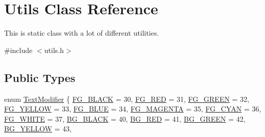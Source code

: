 \hypertarget{classUtils}{}\section{Utils Class Reference}
\label{classUtils}


This is static class with a lot of different utilities.  




{\ttfamily \#include $<$utils.\+h$>$}

\subsection*{Public Types}
\begin{DoxyCompactItemize}
\item 
enum \mbox{\hyperlink{classUtils_a32d52b4a749614335d60c2c3969b8df2}{Text\+Modifier}} \{ \newline
\mbox{\hyperlink{classUtils_a32d52b4a749614335d60c2c3969b8df2a39f1a78939e1d4ce79bcc88d8f0d6a1f}{F\+G\+\_\+\+B\+L\+A\+CK}} = 30, 
\mbox{\hyperlink{classUtils_a32d52b4a749614335d60c2c3969b8df2aecba2732375982cddf19e735b12bf9dc}{F\+G\+\_\+\+R\+ED}} = 31, 
\mbox{\hyperlink{classUtils_a32d52b4a749614335d60c2c3969b8df2afa2e3860716ac053c70f6a89f5a47e45}{F\+G\+\_\+\+G\+R\+E\+EN}} = 32, 
\mbox{\hyperlink{classUtils_a32d52b4a749614335d60c2c3969b8df2aa72d90f0070ff5f60c1226c7eee4d76e}{F\+G\+\_\+\+Y\+E\+L\+L\+OW}} = 33, 
\newline
\mbox{\hyperlink{classUtils_a32d52b4a749614335d60c2c3969b8df2a238297e309e520bd2796c968314b37d4}{F\+G\+\_\+\+B\+L\+UE}} = 34, 
\mbox{\hyperlink{classUtils_a32d52b4a749614335d60c2c3969b8df2a9fb8bfe4dbdecd2dea8dcc13691b6bfe}{F\+G\+\_\+\+M\+A\+G\+E\+N\+TA}} = 35, 
\mbox{\hyperlink{classUtils_a32d52b4a749614335d60c2c3969b8df2a7496759502c74e2fb1b6b41e40d708da}{F\+G\+\_\+\+C\+Y\+AN}} = 36, 
\mbox{\hyperlink{classUtils_a32d52b4a749614335d60c2c3969b8df2a0773c8537cc757b3f91ef3f056fc8e01}{F\+G\+\_\+\+W\+H\+I\+TE}} = 37, 
\newline
\mbox{\hyperlink{classUtils_a32d52b4a749614335d60c2c3969b8df2ae53e180d7734261c1eeb6f5b8046ee24}{B\+G\+\_\+\+B\+L\+A\+CK}} = 40, 
\mbox{\hyperlink{classUtils_a32d52b4a749614335d60c2c3969b8df2ae42dc37bb30e3d6a339e31b8799a0cc8}{B\+G\+\_\+\+R\+ED}} = 41, 
\mbox{\hyperlink{classUtils_a32d52b4a749614335d60c2c3969b8df2a304cda86f4e91dd0f25fe5cc49fa386f}{B\+G\+\_\+\+G\+R\+E\+EN}} = 42, 
\mbox{\hyperlink{classUtils_a32d52b4a749614335d60c2c3969b8df2a605748c9069d2aa85ecfc1b18546e65e}{B\+G\+\_\+\+Y\+E\+L\+L\+OW}} = 43, 
\newline

\end{DoxyCompactItemize}
